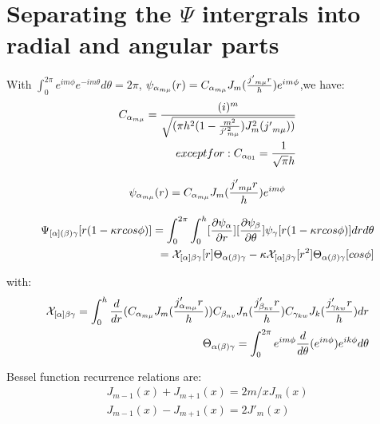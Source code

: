 \documentclass{Note}
\begin{document}
\section{Separating the $\Psi$ intergrals into radial and angular parts}

With $\int_0^{2\pi} e^{im\phi}e^{-im\theta}  d\theta=2\pi$,
$\psi_{\alpha_{m\mu}}(r)=C_{\alpha_{m\mu}}J_m({{j'}_{m\mu} r\over h})e^{im\phi}$,we have:
\begin{equation}
\begin{aligned}
C_{\alpha_{m\mu}}={(i)^m \over \sqrt{({{\pi h^2}(1-{m^2\over {j'}_{m\mu}^2} )}J^2_m({j'}_{m\mu}))}}\\
except for:
C_{\alpha_{01}}={1 \over \sqrt{\pi}h}
\end{aligned}
\end{equation}

\begin{equation}
\begin{aligned}
\psi_{\alpha_{m\mu}}(r)=C_{\alpha_{m\mu}}J_m({{j'}_{m\mu} r\over h})e^{im\phi}
\end{aligned}
\end{equation}



\begin{equation}
\begin{aligned}
\Psi_{[\alpha](\beta)\gamma}[r(1-\kappa r cos\phi)]=\int_0^{2\pi} \int_0^h [{\partial \psi_\alpha \over \partial r}][{\partial \psi_\beta \over \partial \theta}] \psi_\gamma [r(1-\kappa r cos\phi)] dr d\theta \\
=\mathcal{X}_{[\alpha]\beta\gamma}[r]\Theta_{\alpha(\beta)\gamma}-\kappa \mathcal{X}_{[\alpha]\beta\gamma}[r^2]\Theta_{\alpha(\beta)\gamma}[cos\phi]
\end{aligned}
\end{equation}

with:
\begin{equation}
\begin{aligned}
\mathcal{X}_{[\alpha]\beta\gamma}=\int_0^h {d\over dr}(C_{\alpha_{m\mu}} J_m({j'_{\alpha_{m\mu}}r\over h}))C_{\beta_{nv}} J_n({j'_{\beta_{nv}}r\over h})C_{\gamma_{kw}} J_k({j'_{\gamma_{kw}}r\over h})dr\\
\Theta_{\alpha(\beta)\gamma}=\int_0^{2\pi} e^{im\phi} {d\over d\theta} (e^{in\phi}) e^{ik\phi} d\theta
\end{aligned}
\end{equation}


Bessel function recurrence relations are:
\begin{equation}
\begin{aligned}
J_{m-1}(x)+J_{m+1}(x)=2m/x J_m(x)\\
J_{m-1}(x)-J_{m+1}(x)=2J'_m(x)
\end{aligned}
\end{equation}
\end{document}
